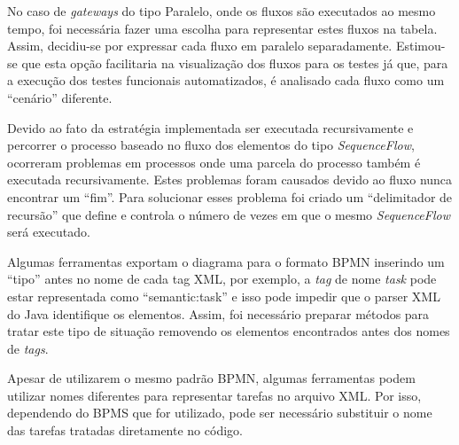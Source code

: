 \documentclass[12pt]{article}
\begin{document}
No caso de \emph{gateways} do tipo Paralelo, onde os fluxos são executados ao mesmo tempo, foi necessária fazer uma escolha para representar estes fluxos na tabela. Assim, decidiu-se por expressar cada fluxo em paralelo separadamente. Estimou-se que esta opção facilitaria na visualização dos fluxos para os testes já que, para a execução dos testes funcionais automatizados, é analisado cada fluxo como um ``cenário'' diferente.


Devido ao fato da estratégia implementada ser executada recursivamente e percorrer o processo baseado no fluxo dos elementos do tipo \emph{SequenceFlow}, ocorreram problemas em processos onde uma parcela do processo também é executada recursivamente. Estes problemas foram causados devido ao fluxo nunca encontrar um ``fim''. Para solucionar esses problema foi criado um ``delimitador de recursão'' que define e controla o número de vezes em que o mesmo \emph{SequenceFlow} será executado.

Algumas ferramentas exportam o diagrama para o formato BPMN inserindo um ``tipo'' antes no nome de cada tag XML, por exemplo, a \emph{tag} de nome \emph{task} pode estar representada como ``semantic:task'' e isso pode impedir que o parser XML do Java identifique os elementos. Assim, foi necessário preparar métodos para tratar este tipo de situação removendo os elementos encontrados antes dos nomes de \emph{tags}.

Apesar de utilizarem o mesmo padrão BPMN, algumas ferramentas podem utilizar nomes diferentes para representar tarefas no arquivo XML. Por isso, dependendo do BPMS que for utilizado, pode ser necessário substituir o nome das tarefas tratadas diretamente no código.


\end{document}
